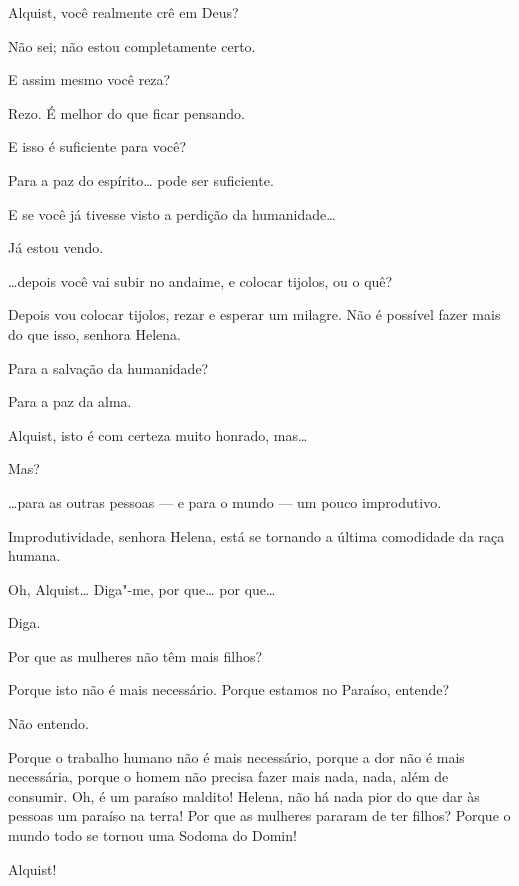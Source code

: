  Alquist, você realmente crê em Deus?

 Não sei; não estou completamente certo.

 E assim mesmo você reza?

 Rezo. É melhor do que ficar pensando.

 E isso é suficiente para você?

 Para a paz do espírito\ldots{} pode ser suficiente.

 E se você já tivesse visto a perdição da humanidade\ldots{}

 Já estou vendo.

 \ldots{}depois você vai subir no andaime, e colocar tijolos, ou o quê?

 Depois vou colocar tijolos, rezar e esperar um milagre. Não é possível
fazer mais do que isso, senhora Helena.

 Para a salvação da humanidade?

 Para a paz da alma.

 Alquist, isto é com certeza muito honrado, mas\ldots{}

 Mas?

 \ldots{}para as outras pessoas --- e para o mundo --- um pouco improdutivo.

 Improdutividade, senhora Helena, está se tornando a última comodidade
da raça humana.

 Oh, Alquist\ldots{} Diga"-me, por que\ldots{} por que\ldots{}

 Diga.

  Por que as mulheres não têm mais filhos?

 Porque isto não é mais necessário. Porque estamos no Paraíso, entende?

 Não entendo.

 Porque o trabalho humano não é mais necessário, porque a dor não é mais
necessária, porque o homem não precisa fazer mais nada, nada, além de
consumir. Oh, é um paraíso maldito!  Helena,
não há nada pior do que dar às pessoas um paraíso na terra! Por que as mulheres
pararam de ter filhos? Porque o mundo todo se tornou uma Sodoma do Domin!

  Alquist!

